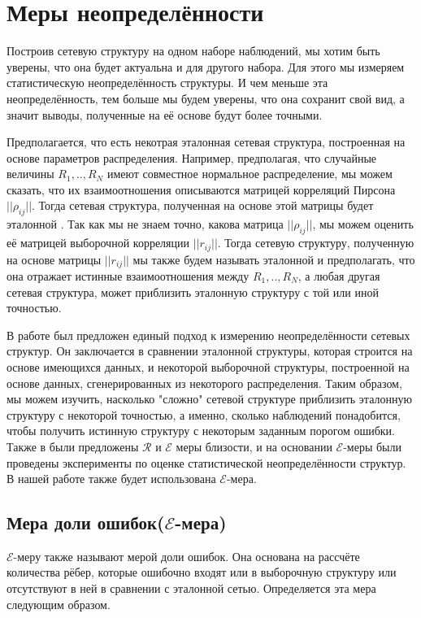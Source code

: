 \section{Меры неопределённости}

Построив сетевую структуру на одном наборе наблюдений, мы хотим быть уверены, что она будет актуальна и для другого набора. Для этого мы измеряем статистическую неопределённость структуры. И чем меньше эта неопределённость, тем больше мы будем  уверены, что она сохранит свой вид, а значит выводы, полученные на её основе будут более точными. 

Предполагается, что есть некотрая эталонная сетевая структура, построенная на основе параметров распределения. Например, предполагая, что случайные величины $R_1, .., R_N$ имеют совместное нормальное распределение, мы можем сказать, что их взаимоотношения описываются матрицей корреляций Пирсона $||\rho_{i j}||$. Тогда сетевая структура, полученная на основе этой матрицы будет эталонной \cite{measures}. Так как мы не знаем точно, какова матрица $||\rho_{i j}||$, мы можем оценить её матрицей выборочной корреляции $||r_{i j}||$. Тогда сетевую структуру, полученную на основе  матрицы $||r_{i j}||$ мы также будем называть эталонной и предполагать, что она отражает истинные взаимоотношения между $R_1, .., R_N$,  а любая другая сетевая структура, может приблизить эталонную структуру с той или иной точностью. 


В работе \cite{measures} был предложен единый подход к измерению неопределённости сетевых структур. Он заключается в сравнении эталонной структуры, которая строится на основе имеющихся данных, и некоторой выборочной структуры, построенной на основе данных, сгенерированных из некоторого распределения. Таким образом, мы можем изучить, насколько "сложно" сетевой структуре приблизить эталонную структуру с некоторой точностью, а именно, сколько наблюдений понадобится, чтобы получить истинную структуру с некоторым заданным порогом ошибки. Также  в \cite{measures} были предложены $\mathcal{R}$ и $\mathcal{E}$ меры близости, и на основании $\mathcal{E}$-меры были проведены эксперименты по оценке статистической неопределённости структур. В нашей работе также будет использована $\mathcal{E}$-мера.


\subsection{Мера доли ошибок($\mathcal{E}$-мера)}

$\mathcal{E}$-меру также называют мерой доли ошибок. Она основана на рассчёте количества рёбер, которые ошибочно входят или в выборочную структуру или отсутствуют в ней в сравнении с эталонной сетью.
Определяется эта мера следующим образом.

